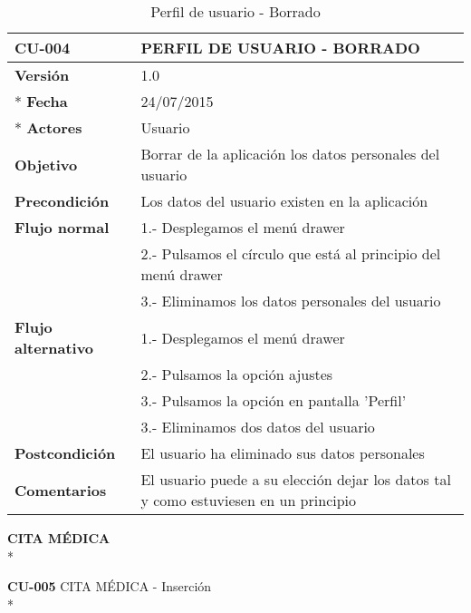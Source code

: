 \documentclass[../pfc.tex]{subfiles}
\begin{document}
	\begin{table}[H]
		\centering
		\begin{tabular}[t]{|p{3cm}|p{9.5cm}|}
			\hline \textbf{CU-004} & \textbf{PERFIL DE USUARIO - BORRADO} \\*
			\hline\hline \textbf{Versión} & 1.0 \\ *
			\hline\hline \textbf{Fecha} & 24/07/2015 \\ *
			\hline\textbf{Actores} 	& Usuario\\*
			\hline \textbf{Objetivo} & Borrar de la aplicación los datos personales del usuario\\* 			
			\hline \textbf{Precondición} & Los datos del usuario existen en la aplicación \\* 
			\hline \textbf{Flujo normal} & 1.- Desplegamos el menú drawer \\* 
			& 2.- Pulsamos el círculo que está al principio del menú drawer\\*	
			& 3.- Eliminamos los datos personales del usuario\\*	
			\hline \textbf{Flujo alternativo} & 1.- Desplegamos el menú drawer \\* 
			& 2.- Pulsamos la opción ajustes \\*	
			& 3.- Pulsamos la opción en pantalla 'Perfil' \\*	
			& 3.- Eliminamos dos datos del usuario\\*	
			\hline \textbf{Postcondición} & El usuario ha eliminado sus datos personales\\* 
			\hline \textbf{Comentarios}   & El usuario puede a su elección dejar los datos tal y como estuviesen en un principio\\* 
			\hline
		\end{tabular}
		\caption{Perfil de usuario - Borrado}
		\label{tabla:caso004}

	\end{table}
	
	
	
	\textbf{CITA MÉDICA}\\*

	\textbf{CU-005}	CITA MÉDICA - Inserción\\*
	
\end{document}
